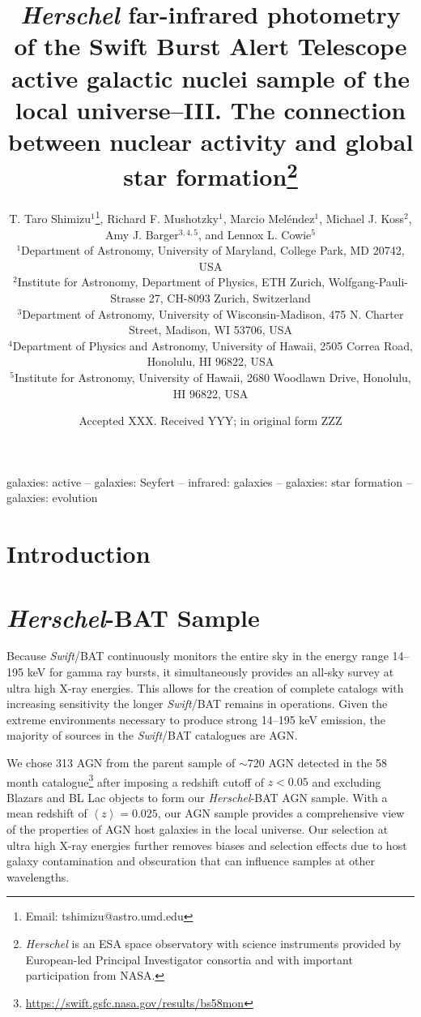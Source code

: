 \documentclass[fleqn, usenatbib]{mnras}
\title[\emph{Herschel}-BAT Sample: AGN-SF Connection]{\emph{Herschel} far-infrared photometry of the Swift Burst Alert
Telescope active galactic nuclei sample of the local universe--III. The connection between nuclear activity and global star formation\thanks{{\it Herschel} is an ESA space observatory with science instruments provided by European-led Principal Investigator consortia and with important participation from NASA.}}
\author[T. T. Shimizu]{T. Taro Shimizu$^{1}$\thanks{Email: tshimizu@astro.umd.edu}, Richard F. Mushotzky$^1$, Marcio Mel\'endez$^1$, Michael J. Koss$^{2}$, \newauthor Amy J. Barger$^{3,4,5}$, and Lennox L. Cowie$^{5}$\\
$^{1}$Department of Astronomy, University of Maryland, College Park, MD 20742, USA\\
$^{2}$Institute for Astronomy, Department of Physics, ETH Zurich, Wolfgang-Pauli-Strasse 27, CH-8093 Zurich, Switzerland\\
$^{3}$Department of Astronomy, University of Wisconsin-Madison, 475 N. Charter Street, Madison, WI 53706, USA\\
$^{4}$Department of Physics and Astronomy, University of Hawaii, 2505 Correa Road, Honolulu, HI 96822, USA\\
$^{5}$Institute for Astronomy, University of Hawaii, 2680 Woodlawn Drive, Honolulu, HI 96822, USA}
\date{Accepted XXX. Received YYY; in original form ZZZ}
\newcommand{\herschel}{\emph{Herschel}}
\newcommand{\swift}{\textit{Swift}}
\begin{document}
\label{firstpage}
\pagerange{\pageref{firstpage}--\pageref{lastpage}}
\maketitle

\begin{abstract}

\end{abstract}

\begin{keywords}
galaxies: active -- galaxies: Seyfert -- infrared: galaxies -- galaxies: star formation -- galaxies: evolution 
\end{keywords}



\section{Introduction}

\section{\herschel-BAT Sample}
Because \swift/BAT continuously monitors the entire sky in the energy range 14--195 keV for gamma ray bursts, it simultaneously provides an all-sky survey at ultra high X-ray energies. This allows for the creation of complete catalogs with increasing sensitivity the longer \swift/BAT remains in operations. Given the extreme environments necessary to produce strong 14--195 keV emission, the majority of sources in the \swift/BAT catalogues are AGN.

We chose 313 AGN from the parent sample of $\sim720$ AGN detected in the 58 month catalogue\footnote{\url{https://swift.gsfc.nasa.gov/results/bs58mon}} after imposing a redshift cutoff of $z<0.05$ and excluding Blazars and BL Lac objects to form our \herschel-BAT AGN sample. With a mean redshift of $\left<z\right> = 0.025$, our AGN sample provides a comprehensive view of the properties of AGN host galaxies in the local universe. Our selection at ultra high X-ray energies further removes biases and selection effects due to host galaxy contamination and obscuration \citep{Mushotzky:2004gf} that can influence samples at other wavelengths.   
\end{document}

